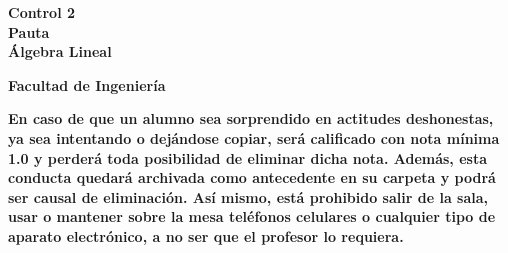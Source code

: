 \documentclass[a4paper]{article}
\begin{document}
\thispagestyle{fancy}
\vspace*{1cm}

\begin{minipage}[r]{12cm}
    \begin{flushright}
    \end{flushright}
\end{minipage}

\begin{center}
\Large{\textbf{Control 2\\ Pauta\\ Álgebra Lineal\\ }}
\end{center}
\vspace{1cm}
\begin{minipage}[r]{15cm}
\begin{flushleft}



\end{flushleft}
\end{minipage}
\vspace{2cm}
\begin{center}
\Large{\textbf{Facultad de Ingeniería}}
\end{center}
\vspace{1cm}
\textbf{En caso de que un alumno sea sorprendido en actitudes deshonestas, ya sea intentando o
dejándose copiar, será calificado con nota mínima 1.0 y perderá toda posibilidad de eliminar
dicha nota. Además, esta conducta quedará archivada como antecedente en su carpeta y
podrá ser causal de eliminación.
Así mismo, está prohibido salir de la sala, usar o mantener sobre la mesa teléfonos celulares
o cualquier tipo de aparato electrónico, a no ser que el profesor lo requiera.}\\



\vspace{5cm}
\newpage
\thispagestyle{empty}
\end{document}
